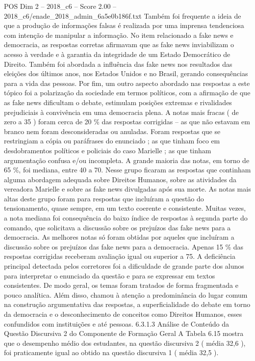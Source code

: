\begin{textsample}{POS Dim 2 – 2018\_c6 – Score 2.00 – 2018\_c6/enade\_2018\_admin\_6a5e0b186f.txt}
Também foi frequente a ideia de que a produção de informações falsas é realizada por uma imprensa tendenciosa com intenção de manipular a informação.
No item relacionado a fake news e democracia, as respostas corretas afirmavam que as fake news inviabilizam o acesso à verdade e à garantia da integridade de um Estado Democrático de Direito.
Também foi abordada a influência das fake news nos resultados das eleições dos últimos anos, nos Estados Unidos e no Brasil, gerando consequências para a vida das pessoas.
Por fim, um outro aspecto abordado nas respostas a este tópico foi a polarização da sociedade em termos políticos, com a afirmação de que as fake news dificultam o debate, estimulam posições extremas e rivalidades prejudiciais à convivência em uma democracia plena.
A notas mais fracas ( de zero a 35 ) foram cerca de 20 \% das respostas corrigidas – as que não estavam em branco nem foram desconsideradas ou anuladas.
Foram respostas que se restringiam a cópia ou paráfrases do enunciado ; as que tinham foco em desdobramentos políticos e policiais do caso Marielle ; as que tinham argumentação confusa e/ou incompleta.
A grande maioria das notas, em torno de 65 \%, foi mediana, entre 40 a 70.
Nesse grupo ficaram as respostas que continham alguma abordagem adequada sobre Direitos Humanos, sobre as atividades da vereadora Marielle e sobre as fake news divulgadas após sua morte.
As notas mais altas deste grupo foram para respostas que incluíram a questão do tensionamento, quase sempre, em um texto coerente e consistente.
Muitas vezes, a nota mediana foi consequência do baixo índice de respostas à segunda parte do comando, que solicitava a discussão sobre os prejuízos das fake news para a democracia.
As melhores notas só foram obtidas por aqueles que incluíram a discussão sobre os prejuízos das fake news para a democracia.
Apenas 15 \% das respostas corrigidas receberam avaliação igual ou superior a 75.
A deficiência principal detectada pelos corretores foi a dificuldade de grande parte dos alunos para interpretar o enunciado da questão e para se expressar em textos consistentes.
De modo geral, os temas foram tratados de forma fragmentada e pouco analítica.
Além disso, chamou à atenção a predominância do lugar comum na construção argumentativa das respostas, a superficialidade do debate em torno da democracia e o desconhecimento de conceitos como Direitos Humanos, esses confundidos com instituições e até pessoas. 6.3.1.3 Análise de Conteúdo da Questão Discursiva 2 do Componente de Formação Geral A Tabela 6.15 mostra que o desempenho médio dos estudantes, na questão discursiva 2 ( média 32,6 ), foi praticamente igual ao obtido na questão discursiva 1 ( média 32,5 ).

\end{textsample}
